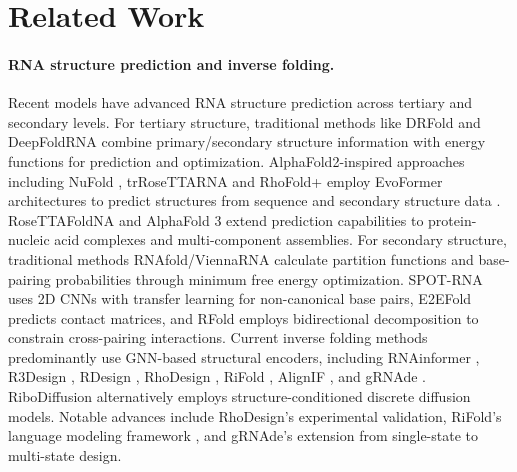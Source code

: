 \section{Related Work}
\label{sec:related}

\paragraph{RNA structure prediction and inverse folding.}
Recent models have advanced RNA structure prediction across tertiary and secondary levels. For tertiary structure, traditional methods like DRFold \citep{li2023integrating}  and DeepFoldRNA \citep{pearce2022novo} combine primary/secondary structure information with energy functions for prediction and optimization. AlphaFold2-inspired approaches including NuFold \citep{kagaya2025nufold}, trRoseTTARNA \citep{wang2023trrosettarna} and RhoFold+ \citep{shen2024accurate} employ EvoFormer architectures to predict structures from sequence and secondary structure data \citep{jumper2021alphafold2}. RoseTTAFoldNA \citep{baek2024accurate} and AlphaFold 3 \citep{abramson2024accurate} extend prediction capabilities to protein-nucleic acid complexes and multi-component assemblies. For secondary structure, traditional methods RNAfold/ViennaRNA \citep{lorenz2011viennarna} calculate partition functions and base-pairing probabilities through minimum free energy optimization. SPOT-RNA \citep{singh2019rna} uses 2D CNNs with transfer learning for non-canonical base pairs, E2EFold \citep{chen2020rna} predicts contact matrices, and RFold \citep{tan2024deciphering} employs bidirectional decomposition to constrain cross-pairing interactions. Current inverse folding methods predominantly use GNN-based structural encoders, including RNAinformer \citep{patil2024towards}, R3Design \citep{tan2025r3design}, RDesign \citep{tanrdesign}, RhoDesign \citep{wong2024deep}, RiFold \citep{liu2025sentences}, AlignIF \citep{wang2025alignment}, and gRNAde \citep{joshi2025grnade}. RiboDiffusion \citep{huang2024ribodiffusion} alternatively employs structure-conditioned discrete diffusion models. Notable advances include RhoDesign's \citep{wong2024deep} experimental validation, RiFold's language modeling framework \citep{liu2025sentences}, and gRNAde's \citep{joshi2025grnade} extension from single-state to multi-state design.

